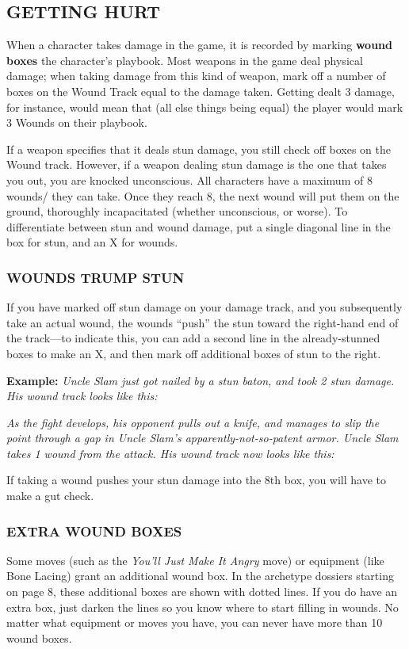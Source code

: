\documentclass[oneside,10pt]{article}
\begin{document}
\begin{multicols}{2}
\subsection{GETTING HURT}
When a character takes damage in the game, it is recorded by
marking \textbf{wound boxes} the character’s playbook. Most weapons in the game deal physical damage; when taking damage
from this kind of weapon, mark off a number of boxes on
the Wound Track equal to the damage taken. Getting dealt 3
damage, for instance, would mean that (all else things being
equal) the player would mark 3 Wounds on their
playbook.

If a weapon specifies that it deals stun damage, you still check
off boxes on the Wound track. However, if a weapon dealing
stun damage is the one that takes you out, you are knocked
unconscious. All characters have a maximum of 8 wounds/
they can take. Once they reach 8, the next wound will put
them on the ground, thoroughly incapacitated (whether
unconscious, or worse). To differentiate between stun and
wound damage, put a single diagonal line in the box for stun,
and an X for wounds.

\subsubsection{WOUNDS TRUMP STUN}

If you have marked off stun damage on your damage track,
and you subsequently take an actual wound, the wounds
“push” the stun toward the right-hand end of the track—to
indicate this, you can add a second line in the already-stunned
boxes to make an X, and then mark off additional boxes of
stun to the right.
\begin{adjustwidth*}{.5cm}{.5cm}

\textbf{Example:} \textit{Uncle Slam just got nailed by a stun baton, and
took 2 stun damage. His wound track looks like
this:}

\textit{As the fight develops, his opponent pulls out a knife, and
manages to slip the point through a gap in Uncle Slam’s
apparently-not-so-patent armor. Uncle Slam takes 1 wound
from the attack. His wound track now looks like this:}
\end{adjustwidth*}

If taking a wound pushes your stun damage into the 8th box,
you will have to make a gut check.
\subsubsection{EXTRA WOUND BOXES}
Some moves (such as the \textit{You’ll Just Make It Angry} move)
 or equipment (like Bone Lacing) grant an additional wound
box. In the archetype dossiers starting on page 8, these
additional boxes are shown with dotted lines. If you do have
an extra box, just darken the lines so you know where to start
filling in wounds. No matter what equipment or moves you
have, you can never have more than 10 wound boxes.


\end{multicols}
\end{document}
